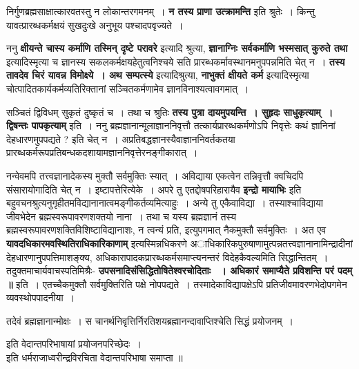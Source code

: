 	निर्गुणब्रह्मसाक्षात्कारवतस्तु न लोकान्तरगमनम्~। {\bfseries न तस्य प्राणा उत्क्रामन्ति} इति श्रुतेः~। किन्तु यावत्प्रारब्धकर्मक्षयं सुखदुःखे अनुभूय पश्चादपवृज्यते~।\par
	ननु {\bfseries क्षीयन्ते चास्य कर्माणि तस्मिन् दृष्टे परावरे} इत्यादि श्रुत्या, {\bfseries ज्ञानाग्निः सर्वकर्माणि भस्मसात् कुरुते तथा} इत्यादिस्मृत्या च ज्ञानस्य सकलकर्मक्षयहेतुत्वनिश्चये सति प्रारब्धकर्मावस्थानमनुपपन्नमिति चेत् न~। {\bfseries तस्य तावदेव चिरं यावन्न विमोक्ष्ये~। अथ सम्पत्स्ये} इत्यादिश्रुत्या, {\bfseries नाभुक्तं क्षीयते कर्म} इत्यादिस्मृत्या चोत्पादितकार्यकर्मव्यतिरिक्तानां सञ्चितकर्मणामेव ज्ञानविनाश्यत्वावगमात्~।\par
	सञ्चितं द्विविधम् सुकृतं दुष्कृतं च~। तथा च श्रुतिः {\bfseries तस्य पुत्रा दायमुपयन्ति~। सुहृदः साधुकृत्याम्~। द्विषन्तः पापकृत्याम्} इति~। ननु ब्रह्मज्ञानान्मूलाज्ञाननिवृत्तौ तत्कार्यप्रारब्धकर्मणोऽपि निवृत्तेः कथं ज्ञानिनां देहधारणमुपपद्यते ? इति चेत् न~। अप्रतिबद्धज्ञानस्यैवाज्ञाननिवर्तकतया प्रारब्धकर्मरूपप्रतिबन्धकदशायामज्ञाननिवृत्तेरनङ्गीकारात्~।\par
	नन्वेवमपि तत्त्वज्ञानादेकस्य मुक्तौ सर्वमुक्तिः स्यात्~। अविद्याया एकत्वेन तन्निवृत्तौ क्वचिदपि संसारायोगादिति चेत् न~। इष्टापत्तेरित्येके~। अपरे तु एतद्दोषपरिहारायैव {\bfseries इन्द्रो मायाभिः} इति बहुवचनश्रुत्यनुगृहीतमविद्यानानात्वमङ्गीकर्तव्यमित्याहुः~। अन्ये तु एकैवाविद्या~। तस्याश्चाविद्याया जीवभेदेन ब्रह्मस्वरूपावरणशक्तयो नाना~। तथा च यस्य ब्रह्मज्ञानं तस्य ब्रह्मस्वरूपावरणशक्तिविशिष्टाविद्यानाशः, न त्वन्यं प्रति, इत्युपगमात् नैकमुक्तौ सर्वमुक्तिः~। अत एव {\bfseries यावदधिकारमवस्थितिराधिकारिकाणाम्} इत्यस्मिन्नधिकरणे अाधिकारिकपुरुषाणामुत्पन्नतत्त्वज्ञानानामिन्द्रादीनां देहधारणानुपपत्तिमाशङ्क्य, अधिकारापादकप्रारब्धकर्मसमाप्त्यनन्तरं विदेहकैवल्यमिति सिद्धान्तितम्~। तदुक्तमाचार्यवाचस्पतिमिश्रैः- {\bfseries उपसनादिसंसिद्धितोषितेश्वरचोदिताः~
	। अधिकारं समाप्यैते प्रविशन्ति परं पदम् ॥} इति~। एतच्चैकमुक्तौ सर्वमुक्तिरिति पक्षे नोपपद्यते~। तस्मादेकाविद्यापक्षेऽपि प्रतिजीवमावरणभेदोपगमेन व्यवस्थोपपादनीया~।\par
	तदेवं ब्रह्मज्ञानान्मोक्षः~। स चानर्थनिवृत्तिर्निरतिशयब्रह्मानन्दावाप्तिश्चेति सिद्धं प्रयोजनम्~।\par
	\begin{center} इति वेदान्तपरिभाषायां प्रयोजनपरिच्छेदः~। \\ इति धर्मराजाध्वरीन्द्रविरचिता वेदान्तपरिभाषा समाप्ता ॥\end{center} 
